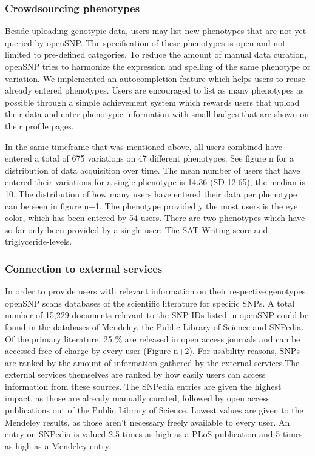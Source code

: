 \documentclass[10pt]{article}
\begin{document}
\subsubsection*{Crowdsourcing phenotypes}
Beside uploading genotypic data, users may list new phenotypes that are not yet 
queried by openSNP. The specification of these phenotypes  is open and not limited 
to pre-defined categories. To reduce the amount of manual data curation, openSNP tries to harmonize 
the expression and spelling of the same phenotype or variation. We implemented an 
autocompletion-feature which helps users to reuse already entered phenotypes.
Users are encouraged to list as many phenotypes as possible through a simple 
achievement system which rewards users that upload their data and enter phenotypic 
information with small badges that are shown on their profile pages.
\begin{comment}
FZ: I changed the structure of the paragraph to make it a little bit more
concise.
I think its best to connect the phenotypes to the above paragraph, explain
the procedure and then talk about the achievments
\end{comment}
In the same timeframe that was mentioned above, all users combined have 
entered a total of 675 variations on 47 different phenotypes. See figure n for a 
distribution of data acquisition over time.
The mean number of users that have entered their variations for a single phenotype 
is 14.36 (SD 12.65), the median is 10. The distribution of how many users have 
entered their data per phenotype can be seen in figure n+1. The phenotype provided 
y the most users is the eye color, which has been entered by 54 users. There are 
two phenotypes which have so far only been provided by a single user: 
The SAT Writing score and triglyceride-levels.
\begin{comment}
FZ: I think we should clarify the difference between variaton and phenotype!
\end{comment}

\subsubsection*{Connection to external services}
In order to provide users with relevant information on their respective genotypes, openSNP scans databases of the scientific literature for specific SNPs. A total number of 15,229 documents relevant to the SNP-IDs listed in openSNP could be found in the databases of Mendeley, the Public Library of Science and SNPedia. Of the primary literature, 25 \% are released in open access journals and can be accessed free of charge by every user (Figure n+2). For usability reasons, SNPs are ranked by the amount of information gathered by the external services.The external services themselves are ranked by how easily users can access information from these sources. The SNPedia entries are given the highest impact, as those are already manually curated, followed by open access publications out of the Public Library of Science. Lowest values are given to the Mendeley results, as those aren't necessary freely available to every user. An entry on SNPedia is valued 2.5 times as high as a PLoS publication and 5 times as high as a Mendeley entry.  
\end{document}
